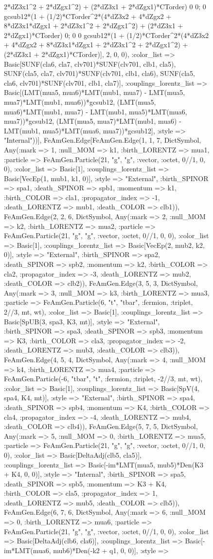 \documentclass{revtex4}
\begin{document}
\begin{figure}[!htb]
\begin{center}
{2*dZ3x1^2 + 2*dZgx1^2) + (2*dZ3x1 + 2*dZgx1)*CTorder) 0 0; 0 gcsub12*(1 + (1/2)*CTorder^2*(4*dZ3x2 + 4*dZgx2 + 8*dZ3x1*dZgx1 + 2*dZ3x1^2 + 2*dZgx1^2) + (2*dZ3x1 + 2*dZgx1)*CTorder) 0; 0 0 gcsub12*(1 + (1/2)*CTorder^2*(4*dZ3x2 + 4*dZgx2 + 8*dZ3x1*dZgx1 + 2*dZ3x1^2 + 2*dZgx1^2) + (2*dZ3x1 + 2*dZgx1)*CTorder)], 2, 0, 0), :color_list => Basic[SUNF(cla6, cla7, clv701)*SUNF(clv701, clb1, cla5), SUNF(cla5, cla7, clv701)*SUNF(clv701, clb1, cla6), SUNF(cla5, cla6, clv701)*SUNF(clv701, clb1, cla7)], :couplings_lorentz_list => Basic[(LMT(mua5, mua6)*LMT(mub1, mua7) - LMT(mua5, mua7)*LMT(mub1, mua6))*gcsub12, (LMT(mua5, mua6)*LMT(mub1, mua7) - LMT(mub1, mua5)*LMT(mua6, mua7))*gcsub12, (LMT(mua5, mua7)*LMT(mub1, mua6) - LMT(mub1, mua5)*LMT(mua6, mua7))*gcsub12], :style => "Internal"))], FeAmGen.Edge[FeAmGen.Edge(1, 1, 7, Dict{Symbol, Any}(:mark => 1, :null_MOM => k1, :birth_LORENTZ => mua1, :particle => FeAmGen.Particle(21, "g", "g", :vector, :octet, 0//1, 0, 0), :color_list => Basic[1], :couplings_lorentz_list => Basic[VecEp(1, mub1, k1, 0)], :style => "External", :birth_SPINOR => spa1, :death_SPINOR => spb1, :momentum => k1, :birth_COLOR => cla1, :propagator_index => -1, :death_LORENTZ => mub1, :death_COLOR => clb1)), FeAmGen.Edge(2, 2, 6, Dict{Symbol, Any}(:mark => 2, :null_MOM => k2, :birth_LORENTZ => mua2, :particle => FeAmGen.Particle(21, "g", "g", :vector, :octet, 0//1, 0, 0), :color_list => Basic[1], :couplings_lorentz_list => Basic[VecEp(2, mub2, k2, 0)], :style => "External", :birth_SPINOR => spa2, :death_SPINOR => spb2, :momentum => k2, :birth_COLOR => cla2, :propagator_index => -3, :death_LORENTZ => mub2, :death_COLOR => clb2)), FeAmGen.Edge(3, 5, 3, Dict{Symbol, Any}(:mark => 3, :null_MOM => k3, :birth_LORENTZ => mua3, :particle => FeAmGen.Particle(6, "t", "tbar", :fermion, :triplet, 2//3, mt, wt), :color_list => Basic[1], :couplings_lorentz_list => Basic[SpUB(3, spa3, K3, mt)], :style => "External", :birth_SPINOR => spa3, :death_SPINOR => spb3, :momentum => K3, :birth_COLOR => cla3, :propagator_index => -2, :death_LORENTZ => mub3, :death_COLOR => clb3)), FeAmGen.Edge(4, 5, 4, Dict{Symbol, Any}(:mark => 4, :null_MOM => k4, :birth_LORENTZ => mua4, :particle => FeAmGen.Particle(-6, "tbar", "t", :fermion, :triplet, -2//3, mt, wt), :color_list => Basic[1], :couplings_lorentz_list => Basic[SpV(4, spa4, K4, mt)], :style => "External", :birth_SPINOR => spa4, :death_SPINOR => spb4, :momentum => K4, :birth_COLOR => cla4, :propagator_index => -4, :death_LORENTZ => mub4, :death_COLOR => clb4)), FeAmGen.Edge(5, 7, 5, Dict{Symbol, Any}(:mark => 5, :null_MOM => 0, :birth_LORENTZ => mua5, :particle => FeAmGen.Particle(21, "g", "g", :vector, :octet, 0//1, 0, 0), :color_list => Basic[DeltaAdj(clb5, cla5)], :couplings_lorentz_list => Basic[-im*LMT(mua5, mub5)*Den(K3 + K4, 0, 0)], :style => "Internal", :birth_SPINOR => spa5, :death_SPINOR => spb5, :momentum => K3 + K4, :birth_COLOR => cla5, :propagator_index => 1, :death_LORENTZ => mub5, :death_COLOR => clb5)), FeAmGen.Edge(6, 7, 6, Dict{Symbol, Any}(:mark => 6, :null_MOM => 0, :birth_LORENTZ => mua6, :particle => FeAmGen.Particle(21, "g", "g", :vector, :octet, 0//1, 0, 0), :color_list => Basic[DeltaAdj(clb6, cla6)], :couplings_lorentz_list => Basic[-im*LMT(mua6, mub6)*Den(-k2 + q1, 0, 0)], :style => }
\end{center}
\end{figure}
\end{document}
